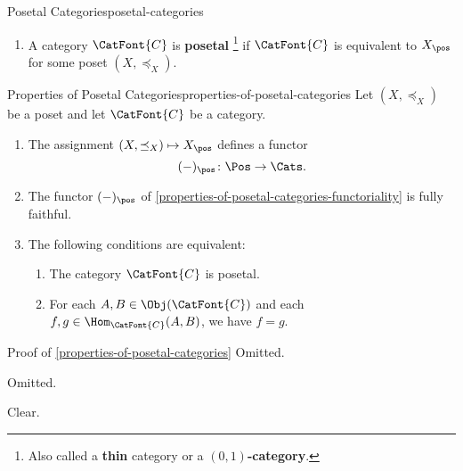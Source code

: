 \begin{definition}{Posetal Categories}{posetal-categories}
\begin{enumerate}
\begin{itemize}
            \end{itemize}
        \item\label{posetal-categories-posetal-categories}A category $\CatFont{C}$ is \textbf{posetal}%
            \footnote{%
                Also called a \textbf{thin} category or a \textbf{$(0,1)$-category}.
                \par\vspace*{-1.75\baselineskip}
            } %
            if $\CatFont{C}$ is equivalent to $X_{\pos}$ for some poset $(X,\preceq_{X})$.
    \end{enumerate}
\end{definition}
\begin{proposition}{Properties of Posetal Categories}{properties-of-posetal-categories}%
    Let $(X,\preceq_{X})$ be a poset and let $\CatFont{C}$ be a category.
    \begin{enumerate}
        \item\label{properties-of-posetal-categories-functoriality}The assignment $(X,\preceq_{X})\mapsto X_{\pos}$ defines a functor
            \[
                (-)_{\pos}%
                \colon%
                \Pos%
                \to%
                \Cats.
            \]%
        \item\label{properties-of-posetal-categories-fully-faithfulness}The functor $(-)_{\pos}$ of \cref{properties-of-posetal-categories-functoriality} is fully faithful.
        \item\label{properties-of-posetal-categories-characterisations}The following conditions are equivalent:
            \begin{enumerate}
                \item\label{properties-of-posetal-categories-characterisations-a}The category $\CatFont{C}$ is posetal.
                \item\label{properties-of-posetal-categories-characterisations-b}For each $A,B\in\Obj(\CatFont{C})$ and each $f,g\in\Hom_{\CatFont{C}}(A,B)$, we have $f=g$.
            \end{enumerate}
    \end{enumerate}
\end{proposition}
\begin{Proof}{Proof of \cref{properties-of-posetal-categories}}%
    Omitted.

    Omitted.

    Clear.
\end{Proof}
